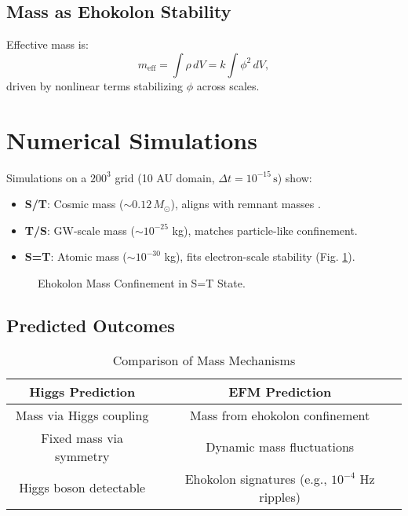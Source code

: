 \documentclass{article}
\begin{document}
\subsection{Mass as Ehokolon Stability}
Effective mass is:
\begin{equation}
m_{\text{eff}} = \int \rho \, dV = k \int \phi^2 \, dV,
\end{equation}
driven by nonlinear terms stabilizing \(\phi\) across scales.

\section{Numerical Simulations}
Simulations on a $200^3$ grid (10 AU domain, \(\Delta t = 10^{-15} \, \text{s}\)) show:
\begin{itemize}
    \item \textbf{S/T}: Cosmic mass ($\sim 0.12 \, M_\odot$), aligns with remnant masses \cite{emvula2025blackholes}.
    \item \textbf{T/S}: GW-scale mass ($\sim 10^{-25}$ kg), matches particle-like confinement.
    \item \textbf{S=T}: Atomic mass ($\sim 10^{-30}$ kg), fits electron-scale stability (Fig. \ref{fig:mass}).
\end{itemize}

\begin{figure}[ht]
    \centering
    \caption{Ehokolon Mass Confinement in S=T State.}
    \label{fig:mass}
\end{figure}

\subsection{Predicted Outcomes}
\begin{table}[h]
    \centering
    \begin{tabular}{|c|c|}
        \hline
        \textbf{Higgs Prediction} & \textbf{EFM Prediction} \\
        \hline
        Mass via Higgs coupling & Mass from ehokolon confinement \\
        Fixed mass via symmetry & Dynamic mass fluctuations \\
        Higgs boson detectable & Ehokolon signatures (e.g., $10^{-4}$ Hz ripples) \\
        \hline
    \end{tabular}
    \caption{Comparison of Mass Mechanisms}
    \label{tab:predictions}
\end{table}
\end{document}
